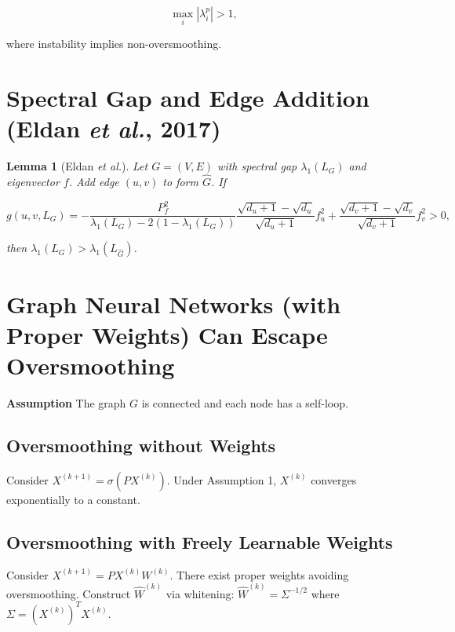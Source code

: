 \documentclass[11pt]{article}\usepackage{amsmath,amssymb,amsthm,bbm}
\newtheorem{lemma}{Lemma}
\newcommand{\1}{\mathbbm{1}}
\begin{document}
$$
\max_i |\lambda^p_i| > 1,
$$

where instability implies non-oversmoothing.

\section*{Spectral Gap and Edge Addition (Eldan \emph{et al.}, 2017)}
\begin{lemma}[Eldan \emph{et al.}]
Let $G=(V,E)$ with spectral gap $\lambda_1(L_G)$ and eigenvector $f$. Add edge $(u,v)$ to form $\hat G$. If

$$
g(u,v,L_G) = -\frac{P_f^2}{\lambda_1(L_G)-2(1-\lambda_1(L_G))}\frac{\sqrt{d_u+1}-\sqrt{d_u}}{\sqrt{d_u+1}}f_u^2 + \frac{\sqrt{d_v+1}-\sqrt{d_v}}{\sqrt{d_v+1}}f_v^2 >0,
$$

then $\lambda_1(L_G)>\lambda_1(L_{\hat G})$.
\end{lemma}

\section*{Graph Neural Networks (with Proper Weights) Can Escape Oversmoothing}
\textbf{Assumption}
The graph $G$ is connected and each node has a self-loop.


\subsection*{Oversmoothing without Weights}
Consider $X^{(k+1)} = \sigma(PX^{(k)})$. Under Assumption 1, $X^{(k)}$ converges exponentially to a constant.

\subsection*{Oversmoothing with Freely Learnable Weights}
Consider $X^{(k+1)} = P X^{(k)} W^{(k)}$. There exist proper weights avoiding oversmoothing. Construct $\hat W^{(k)}$ via whitening: $\hat W^{(k)} = \Sigma^{-1/2}$ where $\Sigma = (X^{(k)})^T X^{(k)}$.
\end{document}
